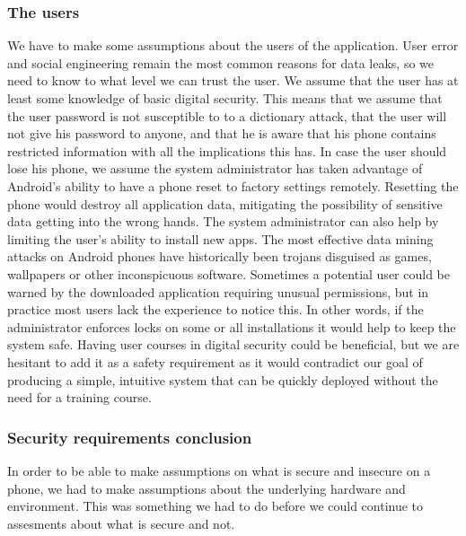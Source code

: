 \subsubsection{The users}
We have to make some assumptions about the users of the application. User error and social engineering remain the most common reasons for data leaks, so we need to know to what level we can trust the user.
\newline
\newline
We assume that the user has at least some knowledge of basic digital security. This means that we assume that the user password is not susceptible to to a dictionary attack, that the user will not give his password to anyone, and that he is aware that his phone contains restricted information with all the implications this has. 
\newline
\newline
In case the user should lose his phone, we assume the system administrator has taken advantage of Android’s ability to have a phone reset to factory settings remotely. Resetting the phone would destroy all application data, mitigating the possibility of sensitive data getting into the wrong hands.
\newline
\newline
The system administrator can also help by limiting the user’s ability to install new apps. The most effective data mining attacks on Android phones have historically been trojans disguised as games, wallpapers or other inconspicuous software. Sometimes a potential user could be warned by the downloaded application requiring unusual permissions, but in practice most users lack the experience to notice this. In other words, if the administrator enforces locks on some or all installations it would help to keep the system safe.
\newline
\newline
Having user courses in digital security could be beneficial, but we are hesitant to add it as a safety requirement as it would contradict our goal of producing a simple, intuitive system that can be quickly deployed without the need for a training course. 

\subsubsection{Security requirements conclusion}
In order to be able to make assumptions on what is secure and insecure on a phone, we had to make assumptions about the underlying hardware and environment. This was something we had to do before we could continue to assesments about what is secure and not.

